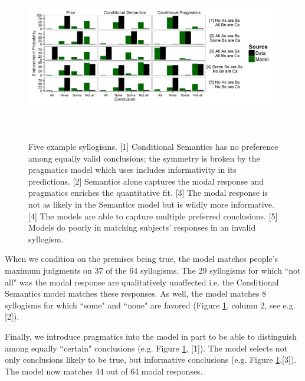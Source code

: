 \documentclass[10pt,letterpaper]{article}
\begin{document}
\begin{figure}
\centering
    \includegraphics[width=\textwidth,height=7.5cm]{fig1_multibar_luceSpeak2}
    \caption{Five example syllogisms. 
    [1] Conditional Semantics has no preference among equally valid conclusions; the symmetry is broken by the pragmatics model which uses includes informativity in its predictions.     
    [2] Semantics alone captures the modal response and pragmatics enriches the quantitative fit.     
    [3] The modal response is not as likely in the Semantics model but is wildly more informative. [4] The models are able to capture multiple preferred conclusions. [5] Models do poorly in matching subjects' responses in an invalid syllogism.}
  \label{fig:barplots}
\end{figure}


When we condition on the premises being true, the model matches people's maximum judgments on 37 of the 64 syllogisms. The 29 syllogisms for which ``not all" was the modal response are qualitatively unaffected i.e. the Conditional Semantics model matches these responses. As well, the model matches 8 syllogisms for which ``some" and ``none" are favored (Figure \ref{fig:barplots}, column 2, see e.g. [2]). 

Finally, we introduce pragmatics into the model in part to be able to distinguish among equally ``certain" conclusions (e.g. Figure \ref{fig:barplots}, [1]). The model selects not only conclusions likely to be true, but informative conclusions (e.g. Figure \ref{fig:barplots},[3]). The model now matches 44 out of 64 modal responses. 
\end{document}
